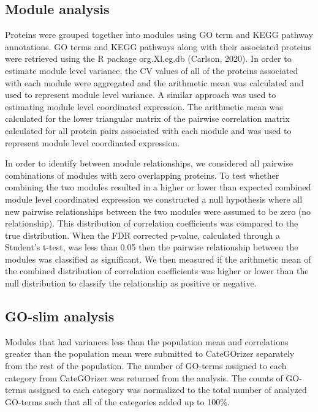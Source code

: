 \subsection{Module analysis}

Proteins were grouped together into modules using GO term and KEGG pathway annotations. GO terms and KEGG pathways along with their associated proteins were retrieved using the R package org.Xl.eg.db (Carlson, 2020). In order to estimate module level variance, the CV values of all of the proteins associated with each module were aggregated and the arithmetic mean was calculated and used to represent module level variance. A similar approach was used to estimating module level coordinated expression. The arithmetic mean was calculated for the lower triangular matrix of the pairwise correlation matrix calculated for all protein pairs associated with each module and was used to represent module level coordinated expression.

In order to identify between module relationships, we considered all pairwise combinations of modules with zero overlapping proteins. To test whether combining the two modules resulted in a higher or lower than expected combined module level coordinated expression we constructed a null hypothesis where all new pairwise relationships between the two modules were assumed to be zero (no relationship). This distribution of correlation coefficients was compared to the true distribution. When the FDR corrected p-value, calculated through a Student’s t-test, was less than 0.05 then the pairwise relationship between the modules was classified as significant. We then measured if the arithmetic mean of the combined distribution of correlation coefficients was higher or lower than the null distribution to classify the relationship as positive or negative.

\subsection{GO-slim analysis}

Modules that had variances less than the population mean and correlations greater than the population mean were submitted to CateGOrizer separately from the rest of the population. The number of GO-terms assigned to each category from CateGOrizer was returned from the analysis. The counts of GO-terms assigned to each category was normalized to the total number of analyzed GO-terms such that all of the categories added up to 100\%.


